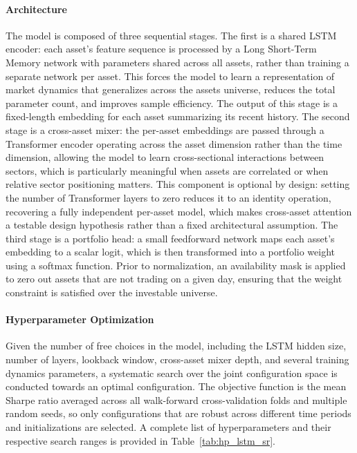 \paragraph{Architecture} The model is composed of three sequential stages. The first is a shared LSTM encoder: each asset's feature sequence is processed by a Long Short-Term Memory network with parameters shared across all assets, rather than training a separate network per asset. This forces the model to learn a representation of market dynamics that generalizes across the assets universe, reduces the total parameter count, and improves sample efficiency. The output of this stage is a fixed-length embedding for each asset summarizing its recent history. The second stage is a cross-asset mixer: the per-asset embeddings are passed through a Transformer encoder operating across the asset dimension rather than the time dimension, allowing the model to learn cross-sectional interactions between sectors, which is particularly meaningful when assets are correlated or when relative sector positioning matters. This component is optional by design: setting the number of Transformer layers to zero reduces it to an identity operation, recovering a fully independent per-asset model, which makes cross-asset attention a testable design hypothesis rather than a fixed architectural assumption. The third stage is a portfolio head: a small feedforward network maps each asset's embedding to a scalar logit, which is then transformed into a portfolio weight using a softmax function. Prior to normalization, an availability mask is applied to zero out assets that are not trading on a given day, ensuring that the weight constraint is satisfied over the investable universe.

\paragraph{Hyperparameter Optimization} Given the number of free choices in the model, including the LSTM hidden size, number of layers, lookback window, cross-asset mixer depth, and several training dynamics parameters, a systematic search over the joint configuration space is conducted towards an optimal configuration. The objective function is the mean Sharpe ratio averaged across all walk-forward cross-validation folds and multiple random seeds, so only configurations that are robust across different time periods and initializations are selected. A complete list of hyperparameters and their respective search ranges is provided in Table~\ref{tab:hp_lstm_sr}.



